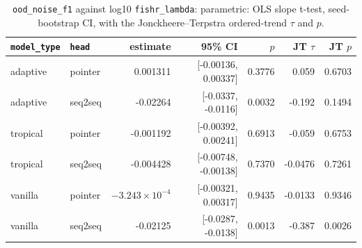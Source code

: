 \documentclass[10pt]{article}
\begin{document}
{\small
\begin{longtable}{llrrrrr}
\caption{\texttt{ood\_noise\_f1} against log10 \texttt{fishr\_lambda}: parametric: OLS slope t-test, seed-bootstrap CI, with the Jonckheere--Terpstra ordered-trend $\tau$ and $p$.}\label{tab:trend-ood_noise_f1}\\
\toprule
\texttt{model\_type} & \texttt{head} & estimate & 95\% CI & $p$ & JT $\tau$ & JT $p$\\
\midrule
\endhead
adaptive & pointer & 0.001311 & [-0.00136, 0.00337] & 0.3776 & 0.059 & 0.6703\\
adaptive & seq2seq & -0.02264 & [-0.0337, -0.0116] & 0.0032 & -0.192 & 0.1494\\
tropical & pointer & -0.001192 & [-0.00392, 0.00241] & 0.6913 & -0.059 & 0.6753\\
tropical & seq2seq & -0.004428 & [-0.00748, -0.00138] & 0.7370 & -0.0476 & 0.7261\\
vanilla & pointer & $-3.243\times10^{-4}$ & [-0.00321, 0.00317] & 0.9435 & -0.0133 & 0.9346\\
vanilla & seq2seq & -0.02125 & [-0.0287, -0.0138] & 0.0013 & -0.387 & 0.0026\\
\bottomrule
\end{longtable}
}
\end{document}
